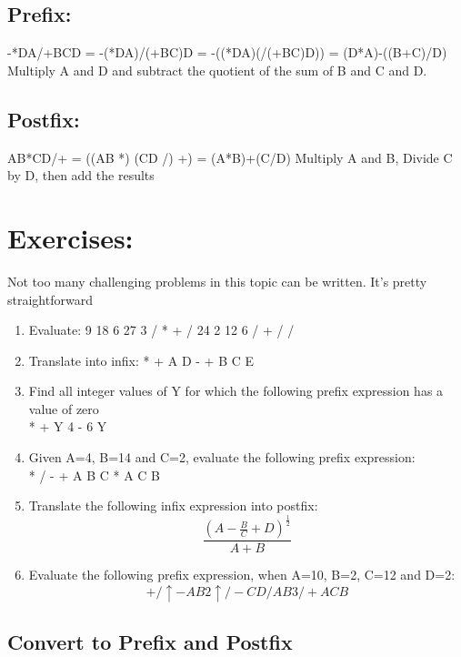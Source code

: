 \documentclass{pset_template}
\begin{document}
\subsection{Prefix:}
-*DA/+BCD = -(*DA)/(+BC)D = -((*DA)(/(+BC)D)) = (D*A)-((B+C)/D) Multiply A and D and subtract the quotient of the sum of B and C and D.

\subsection{Postfix:}
AB*CD/+ = ((AB *) (CD /) +) = (A*B)+(C/D)
Multiply A and B, Divide C by D, then add the results

\section{Exercises:}
Not too many challenging problems in this topic can be written. It's pretty straightforward

\begin{enumerate}

\item Evaluate: 9 18 6 27 3 / * + / 24 2 12 6 / + / /

\item Translate into infix: * + A D - + B C E

\item Find all integer values of Y for which the following prefix expression has
a value of zero\\
* + Y 4 - 6 Y

\item Given A=4, B=14 and C=2, evaluate the following prefix expression: \\
* / - + A B C * A C B

\item Translate the following infix expression into postfix:\\
\begin{equation*}
\frac{(A-\frac{B}{C}+D)^{\frac{1}{2}}}{A+B}
\end{equation*}

\item Evaluate the following prefix expression, when A=10, B=2, C=12 and D=2:\\
\begin{equation*}
+ / \uparrow - A B 2 \uparrow / - C D / A B 3 / + A C B
\end{equation*}
\end{enumerate}

\subsection{Convert to Prefix and Postfix}
\label{sec:convert}
\end{document}
